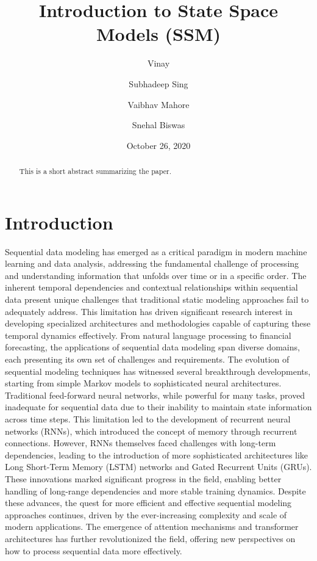 \documentclass[twocolumn,11pt]{article}
\title{\textbf{Introduction to State Space Models (SSM)}}
\author[]{Vinay}
\author[]{Subhadeep Sing}
\author[]{Vaibhav Mahore}
\author[]{Snehal Biswas}
\affil[]{Indian Institute of Science, Bangalore \\
\texttt{\{vinay2023 ,shubadeeps ,mvaibhav ,snehalbiswas\}@iisc.ac.in}}
\date{October 26, 2020} %
\begin{document}
\maketitle

\begin{abstract}
This is a short abstract summarizing the paper. 
\end{abstract}

\section{Introduction}
Sequential data modeling has emerged as a critical paradigm in modern machine learning and data analysis, addressing the fundamental challenge of processing and understanding information that unfolds over time or in a specific order. The inherent temporal dependencies and contextual relationships within sequential data present unique challenges that traditional static modeling approaches fail to adequately address. This limitation has driven significant research interest in developing specialized architectures and methodologies capable of capturing these temporal dynamics effectively. From natural language processing to financial forecasting, the applications of sequential data modeling span diverse domains, each presenting its own set of challenges and requirements. The evolution of sequential modeling techniques has witnessed several breakthrough developments, starting from simple Markov models to sophisticated neural architectures. Traditional feed-forward neural networks, while powerful for many tasks, proved inadequate for sequential data due to their inability to maintain state information across time steps. This limitation led to the development of recurrent neural networks (RNNs), which introduced the concept of memory through recurrent connections. However, RNNs themselves faced challenges with long-term dependencies, leading to the introduction of more sophisticated architectures like Long Short-Term Memory (LSTM) networks and Gated Recurrent Units (GRUs). These innovations marked significant progress in the field, enabling better handling of long-range dependencies and more stable training dynamics. Despite these advances, the quest for more efficient and effective sequential modeling approaches continues, driven by the ever-increasing complexity and scale of modern applications. The emergence of attention mechanisms and transformer architectures has further revolutionized the field, offering new perspectives on how to process sequential data more effectively.
\end{document}
